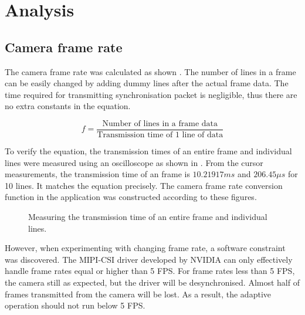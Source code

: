 \chapter{Analysis} \label{Chapter:Analysis}

\section{Camera frame rate}
\label{ana:cam:fps}

The camera frame rate was calculated as shown  . The number of lines in a frame can be easily changed by adding dummy lines after the actual frame data. The time required for transmitting synchronisation packet is negligible, thus there are no extra constants in the equation.

\begin{equation}
	f = \frac{\text{Number of lines in a frame data}}{\text{Transmission time of 1 line of data}}
	\label{ana:cam:eq:rate}
\end{equation}

To verify the equation, the transmission times of an entire frame and individual lines were measured using an oscilloscope as shown in . From the cursor measurements, the transmission time of an frame is $10.21917 ms$ and $206.45 \mu s$ for 10 lines. It matches the equation precisely. The camera frame rate conversion function in the application was constructed according to these figures.

\begin{figure}[!htb]
  \centering
  \caption{Measuring the transmission time of an entire frame and individual lines.}
  \label{ana:cam:osc:time}
\end{figure}

However, when experimenting with changing frame rate, a software constraint was discovered. The MIPI-CSI driver developed by NVIDIA can only effectively handle frame rates equal  or higher than 5 FPS. For frame rates less than 5 FPS, the camera still  as expected, but the driver will be desynchronised. Almost half of frames transmitted from the camera will be lost. As a result, the adaptive operation should not run below 5 FPS.


